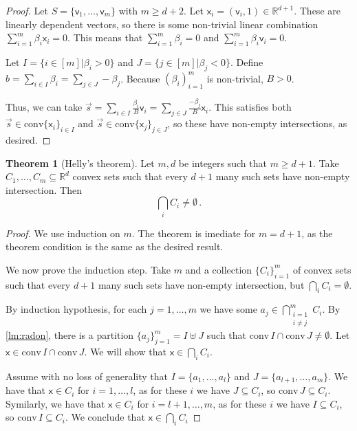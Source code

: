 \documentclass[12pt]{amsart}
\theoremstyle{definition}
\newtheorem{thm}{Theorem}[section]
\newcommand{\R}{\mathbb{R}}
\newcommand{\vv}{\mathsf{v}}
\newcommand{\vx}{\mathsf{x}}
\newcommand{\conv}{\mathrm{conv}}
\begin{document}
\begin{proof}
Let $S = \{\vv_1, \ldots, \vv_m \}$ with $m\geq d+2$.
Let $\vx_i = (\vv_i, 1)\in \R^{d+1}$.
These are linearly dependent vectors, so there is some non-trivial linear combination $\sum_{i=1}^m \beta_i \vx_i = 0$.
This means that $\sum_{i=1}^m \beta_i = 0$ and $\sum_{i=1}^m \beta_i \vv_i = 0$.

Let $I = \{i\in [m] | \beta_i  > 0 \}$ and $J = \{j\in [m] | \beta_j < 0 \}$.
Define $b = \sum_{i\in I} \beta_i = \sum_{j\in J} - \beta_j$.
Because $(\beta_i)_{i=1}^m$ is non-trivial, $B>0$.

Thus, we can take $\vec{s} = \sum_{i\in I} \frac{\beta_i}{B} \vv_i = \sum_{j\in J}\frac{-\beta_j}{B}\vx_i$.
This satisfies both $\vec{s} \in \conv \{\vx_i\}_{i\in I}$ and $\vec{s} \in \conv \{\vx_j\}_{j\in J}$, so these have non-empty intersections, as desired.
\end{proof}


\begin{thm}[Helly's theorem]\label{thm:helly}
Let $m, d $ be integers such that $m \geq d+1$.
Take $C_1, \ldots , C_m \subseteq \R^d$ convex sets such that every $d+1$ many such sets have non-empty intersection.
Then 
$$\bigcap_i C_i \neq \emptyset \, . $$
\end{thm}

\begin{proof}
We use induction on $m$.
The theorem is imediate for $m = d+1$, as the theorem condition is the same as the desired result.

We now prove the induction step.
Take $m$ and a collection $\{C_i\}_{i=1}^m$ of convex sets such that every $d+1$ many such sets have non-empty intersection, but $\bigcap_i C_i = \emptyset$.

By induction hypothesis, for each $j = 1, \ldots, m$ we have some $a_j \in \bigcap_{\substack{i=1 \\ i\neq j}}^m C_i$.
By \cref{lm:radon}, there is a partition $\{a_j\}_{j=1}^m = I \uplus J$ such that $\conv \, I \cap \conv \, J \neq \emptyset$.
Let $\vx \in \conv \, I \cap \conv \, J $.
We will show that $\vx \in \bigcap_i C_i$.

Assume with no loss of generality that $I = \{a_1, \ldots, a_l\} $ and $J= \{ a_{l+1} , \ldots, a_m\}$.
We have that $\vx \in C_i$ for $i = 1, \ldots, l$, as for these $i$ we have $J \subseteq  C_i$, so $\conv \, J \subseteq C_i$.
Symilarly, we have that $\vx \in C_i$ for $i = l+1, \ldots, m$, as for these $i$ we have $I \subseteq  C_i$, so $\conv \, I \subseteq C_i$.
We conclude that $\vx \in \bigcap_i C_i$
\end{proof}
\end{document}
